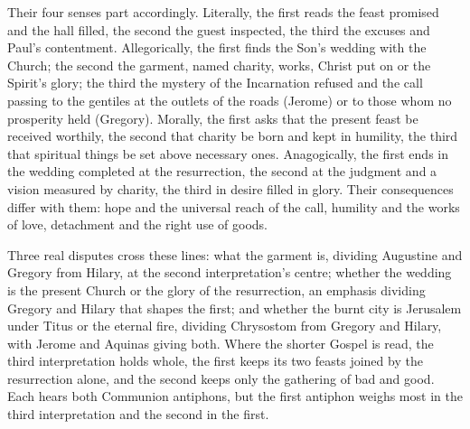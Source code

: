 Their four senses part accordingly. Literally, the first reads the feast
promised and the hall filled, the second the guest inspected, the third the
excuses and Paul's contentment. Allegorically, the first finds the Son's
wedding with the Church; the second the garment, named charity, works, Christ
put on or the Spirit's glory; the third the mystery of the Incarnation refused
and the call passing to the gentiles at the outlets of the roads (Jerome) or to
those whom no prosperity held (Gregory). Morally, the first asks that the
present feast be received worthily, the second that charity be born and kept
in humility, the third that spiritual things be set above necessary ones.
Anagogically, the first ends in the wedding completed at the resurrection, the
second at the judgment and a vision measured by charity, the third in desire
filled in glory. Their consequences differ with them: hope and the universal
reach of the call, humility and the works of love, detachment and the right
use of goods.

Three real disputes cross these lines: what the garment is, dividing Augustine
and Gregory from Hilary, at the second interpretation's centre; whether the
wedding is the present Church or the glory of the resurrection, an emphasis
dividing Gregory and Hilary that shapes the first; and whether the burnt city
is Jerusalem under Titus or the eternal fire, dividing Chrysostom from Gregory
and Hilary, with Jerome and Aquinas giving both. Where the shorter Gospel is
read, the third interpretation holds whole, the first keeps its two feasts
joined by the resurrection alone, and the second keeps only the gathering of
bad and good. Each hears both Communion antiphons, but the first antiphon
weighs most in the third interpretation and the second in the first.
